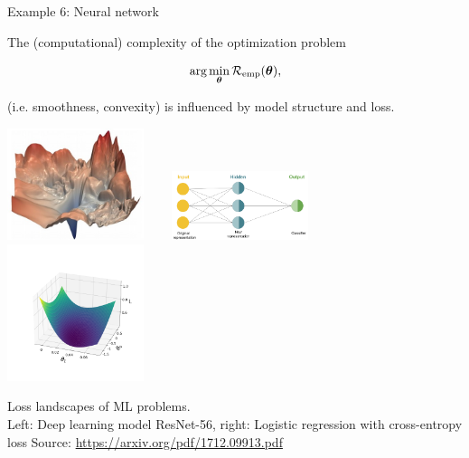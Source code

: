 \documentclass[11pt,compress,t,notes=noshow, xcolor=table]{beamer}
\begin{document}
\begin{vbframe}{Example 6: Neural network}

The (computational) complexity of the optimization problem 

$$
\text{arg} \min_{\bm{\theta}} \mathcal{R}_{\text{emp}}(\bm{\theta}),
$$

(i.e. smoothness, convexity) is influenced by model structure and loss. 		
\vspace*{-0.3cm}
\begin{center}
		\includegraphics[width=0.3\textwidth]{figure_man/ml_landscape.jpg} ~~~ \includegraphics[width=0.3\textwidth]{figure_man/newrep_n_f.png} ~~~ \includegraphics[width=0.3\textwidth]{figure_man/log_reg.png} 
	\begin{footnotesize}
		\newline
		Loss landscapes of ML problems. \\ Left: Deep learning model ResNet-56, right: Logistic regression with cross-entropy loss
		\newline
		Source: \url{https://arxiv.org/pdf/1712.09913.pdf}
	\end{footnotesize}
\end{center}	

\end{vbframe}


\endlecture
\end{document}
